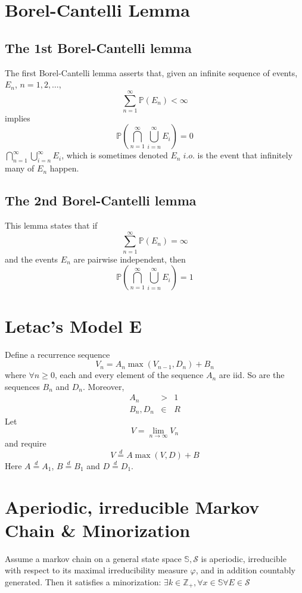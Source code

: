 \documentclass[12pt]{article}
\newcommand{\p}{
        \mathbb{P}
}
\begin{document}
\maketitle

\section{Borel-Cantelli Lemma}
\subsection{The 1st Borel-Cantelli lemma}
The first Borel-Cantelli lemma asserts that, given an infinite
sequence of events, $E_n$, $n = 1, 2, \dots$,
\[
\sum_{n=1}^\infty \p(E_n) < \infty
\]
implies
\[
\p(\bigcap_{n=1}^\infty \bigcup_{i=n}^\infty E_i) = 0
\]
$\bigcap_{n=1}^\infty \bigcup_{i=n}^\infty E_i$, which is sometimes
denoted $E_n\;i.o.$ is the event that infinitely many of $E_n$
happen.

\subsection{The 2nd Borel-Cantelli lemma}
This lemma states that if
\[
\sum_{n=1}^\infty \p(E_n) = \infty
\]
and the events $E_n$ are pairwise independent, then
\[
\p(\bigcap_{n=1}^\infty \bigcup_{i=n}^\infty E_i) = 1
\]

\section{Letac's Model E}
Define a recurrence sequence
\[
V_n = A_n \max(V_{n-1}, D_n) + B_n
\]
where $\forall n \geq 0$, each and every element of the sequence $A_n$
are iid. So are the sequences $B_n$ and $D_n$. Moreover,
\begin{eqnarray*}
  A_n &>& 1 \\
  B_n, D_n &\in& R
\end{eqnarray*}
Let
\[
V = \lim_{n \to \infty} V_n
\]
and require
\[
V  \overset{d}{=} A \max(V, D) + B
\]
Here $A \overset{d}{=} A_1$, $B \overset{d}{=} B_1$ and $D \overset{d}{=} D_1$.
\section{Aperiodic, irreducible Markov Chain \& Minorization}
Assume a markov chain on a general state space $\mathbb S, \mathcal S$
is aperiodic, irreducible with respect to its maximal irreducibility
measure $\varphi$, and in addition countably generated. Then it satisfies
a minorization: $\exists k \in \mathbb Z_+, \forall x \in \mathbb S
\forall E \in \mathcal S$
\end{document}
